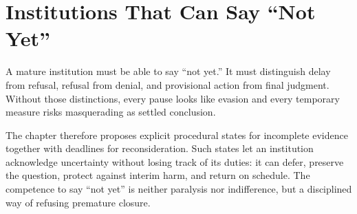 
\chapter{Institutions That Can Say “Not Yet”}
\label{ch:ch104}

A mature institution must be able to say ``not yet.'' It must distinguish delay from refusal, refusal from denial, and provisional action from final judgment. Without those distinctions, every pause looks like evasion and every temporary measure risks masquerading as settled conclusion.

The chapter therefore proposes explicit procedural states for incomplete evidence together with deadlines for reconsideration. Such states let an institution acknowledge uncertainty without losing track of its duties: it can defer, preserve the question, protect against interim harm, and return on schedule. The competence to say ``not yet'' is neither paralysis nor indifference, but a disciplined way of refusing premature closure.
